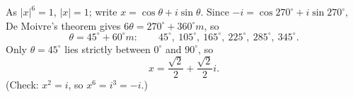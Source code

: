 As $|x|^6=1$, $|x|=1$; write $x=\cos\theta+i\sin\theta$. Since $-i=\cos270^\circ+i\sin270^\circ$, De Moivre's theorem gives $6\theta=270^\circ+360^\circ m$, so
\[\theta=45^\circ+60^\circ m:\qquad45^\circ,\ 105^\circ,\ 165^\circ,\ 225^\circ,\ 285^\circ,\ 345^\circ.\]
Only $\theta=45^\circ$ lies strictly between $0^\circ$ and $90^\circ$, so
\[x=\boxed{\dfrac{\sqrt2}{2}+\dfrac{\sqrt2}{2}i}.\]
(Check: $x^2=i$, so $x^6=i^3=-i$.)
